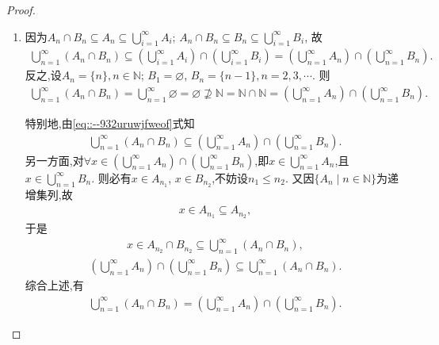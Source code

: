 \documentclass[../../main.tex]{subfiles}%
\begin{document}
\begin{proof}
\begin{enumerate}[(1)]
\item 因为$A_n \cap B_n \subseteq A_n \subseteq \bigcup_{i=1}^{\infty} A_i$; $A_n \cap B_n \subseteq B_n \subseteq \bigcup_{i=1}^{\infty} B_i$, 故
\begin{align}\label{eq::--932uruwjfweof}
\bigcup_{n=1}^{\infty} (A_n \cap B_n) \subseteq \left( \bigcup_{i=1}^{\infty} A_i \right) \cap \left( \bigcup_{i=1}^{\infty} B_i \right) = \left( \bigcup_{n=1}^{\infty} A_n \right) \cap \left( \bigcup_{n=1}^{\infty} B_n \right).
\end{align}
反之,设$A_n = \{n\}, n \in \mathbb{N}$; $B_1 = \varnothing$, $B_n = \{n-1\}, n=2,3,\cdots$. 则
\begin{align*}
\bigcup_{n=1}^{\infty} (A_n \cap B_n) = \bigcup_{n=1}^{\infty} \varnothing = \varnothing \nsupseteq \mathbb{N} = \mathbb{N} \cap \mathbb{N} = \left( \bigcup_{n=1}^{\infty} A_n \right) \cap \left( \bigcup_{n=1}^{\infty} B_n \right).
\end{align*}

特别地,由\eqref{eq::--932uruwjfweof}式知
\begin{align*}
\bigcup_{n=1}^{\infty} (A_n \cap B_n) \subseteq \left( \bigcup_{n=1}^{\infty} A_n \right) \cap \left( \bigcup_{n=1}^{\infty} B_n \right).
\end{align*}
另一方面,对$\forall x \in \left( \bigcup_{n=1}^{\infty} A_n \right) \cap \left( \bigcup_{n=1}^{\infty} B_n \right)$,即$x \in \bigcup_{n=1}^{\infty} A_n$,且$x \in \bigcup_{n=1}^{\infty} B_n$. 则必有$x \in A_{n_1}$, $x \in B_{n_2}$,不妨设$n_1 \leqslant n_2$. 又因$\{A_n \mid n \in \mathbb{N}\}$为递增集列,故
\begin{align*}
x \in A_{n_1} \subseteq A_{n_2},
\end{align*}
于是
\begin{align*}
x \in A_{n_2} \cap B_{n_2} \subseteq \bigcup_{n=1}^{\infty} (A_n \cap B_n),
\end{align*}
\begin{align*}
\left( \bigcup_{n=1}^{\infty} A_n \right) \cap \left( \bigcup_{n=1}^{\infty} B_n \right) \subseteq \bigcup_{n=1}^{\infty} (A_n \cap B_n).
\end{align*}
综合上述,有
\begin{align*}
\bigcup_{n=1}^{\infty} (A_n \cap B_n) = \left( \bigcup_{n=1}^{\infty} A_n \right) \cap \left( \bigcup_{n=1}^{\infty} B_n \right).
\end{align*}
\end{enumerate}

\end{proof}
\end{document}
